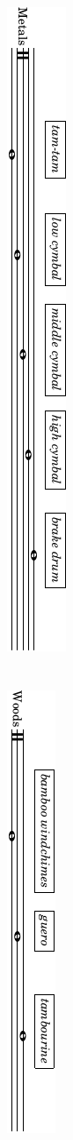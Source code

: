 \begin{itemize}
        \includegraphics{../assets/preface-percussion-metals.pdf} \\ \\ \\
        \includegraphics{../assets/preface-percussion-woods.pdf} \\ \\ \\

\end{itemize}
